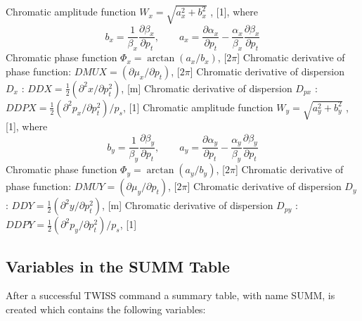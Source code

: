 \begin{madlist}
   Chromatic amplitude function $W_x = \sqrt{a_x^2 + b_x^2}$ ,
         [1], where \\
         \[
         b_x = \frac{1}{\beta_x} \frac{\partial \beta_x}{\partial p_t}  ,\qquad
         a_x = \frac{\partial \alpha_x}{\partial p_t} -
         \frac{\alpha_x}{\beta_x}\frac{\partial \beta_x}{\partial p_t}
         \]
   Chromatic phase function $\Phi_x = \arctan (a_x / b_x)$, [$2 \pi$] 
   Chromatic derivative of phase function: 
  $DMUX = (\partial \mu_x / \partial p_t)$,  [$2 \pi$]
   Chromatic derivative of dispersion $D_x$ :  
  $DDX = \frac{1}{2} (\partial^2 x / \partial p_t^2)$, [m]     
   Chromatic derivative of dispersion $D_{px}$ : 
  $DDPX = \frac{1}{2} ( \partial^2 p_x / \partial p_t^2 ) / p_s $, [1]
   Chromatic amplitude function $W_y = \sqrt{a_y^2 + b_y^2}$ ,
         [1], where \\
         \[
         b_y = \frac{1}{\beta_y} \frac{\partial \beta_y}{\partial p_t} ,\qquad
         a_y = \frac{\partial \alpha_y}{\partial p_t} -
         \frac{\alpha_y}{\beta_y}\frac{\partial \beta_y}{\partial p_t}
         \]
   Chromatic phase function $\Phi_y = \arctan (a_y / b_y)$, [$2 \pi$]
   Chromatic derivative of phase function:
  $DMUY = (\partial \mu_y / \partial p_t)$,  [$2 \pi$] 
   Chromatic derivative of dispersion $D_y$ : 
  $DDY = \frac{1}{2} (\partial^2 y / \partial p_t^2)$, [m]      
   Chromatic derivative of dispersion $D_{py}$ : 
  $DDPY = \frac{1}{2} ( \partial^2 p_y / \partial p_t^2 ) / p_s $, [1] 
\end{madlist}

\subsection{Variables in the SUMM Table}
\label{subsec:tables-summ}
After a successful TWISS command a summary table, with name SUMM, is created which
contains the following variables:  

